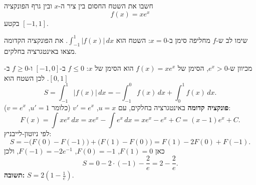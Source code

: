 
\begin{question}
חשבו את השטח החסום בין ציר ה-$x$ ובין גרף הפונקציה
\[ f(x) = xe^x \]
בקטע $[-1, 1]$.
\end{question}

\begin{hint}
שימו לב ש-$f$ מחליפה סימן ב-$x = 0$: השטח הוא $\int_{-1}^1 |f(x)|\,dx$. את הפונקציה הקדומה מצאו באינטגרציה בחלקים.
\end{hint}

\begin{solution}
מכיוון ש-$e^x > 0$, הסימן של $f(x) = xe^x$ הוא הסימן של $x$: $f \le 0$ ב-$[-1, 0]$ ו-$f \ge 0$ ב-$[0, 1]$. לכן השטח הוא
\[ S = \int_{-1}^1 |f(x)|\,dx = -\int_{-1}^0 f(x)\,dx + \int_0^1 f(x)\,dx. \]
\textbf{פונקציה קדומה} באינטגרציה בחלקים, עם $u = x$, $v' = e^x$ (כלומר $u' = 1$, $v = e^x$):
\[ F(x) = \int xe^x\,dx = xe^x - \int e^x\,dx = xe^x - e^x + C = (x - 1)e^x + C. \]
לפי ניוטון-לייבניץ:
\[ S = -\bigl(F(0) - F(-1)\bigr) + \bigl(F(1) - F(0)\bigr) = F(1) - 2F(0) + F(-1). \]
כאן $F(1) = 0$, $F(0) = -1$, $F(-1) = -2e^{-1}$, ולכן
\[ S = 0 - 2\cdot(-1) - \frac{2}{e} = 2 - \frac{2}{e}. \]
\textbf{תשובה:} $\boxed{S = 2\left(1 - \frac1e\right)}$.
\end{solution}
